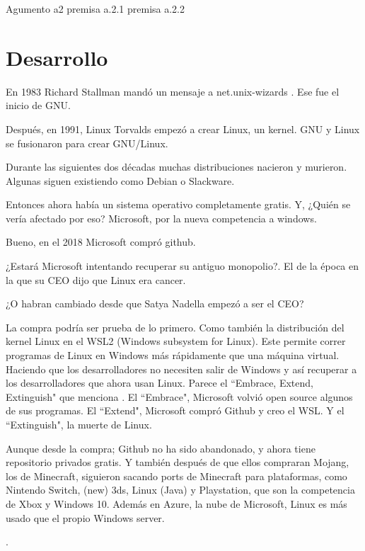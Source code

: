 \documentclass[12pt, twoside]{article}
\begin{document}
Agumento a2
premisa a.2.1
premisa a.2.2

\section{Desarrollo}%
\label{sec:Desarrollo}
En 1983 Richard Stallman mandó un mensaje a net.unix-wizards \citet[89]{faif}.
Ese fue el inicio de GNU.

Después, en 1991, Linux Torvalds empezó a crear Linux, un kernel.
GNU y Linux se fusionaron para crear GNU/Linux.

Durante las siguientes dos décadas muchas distribuciones nacieron y murieron.
Algunas siguen existiendo como Debian o Slackware. \citet{DISTROS}

Entonces ahora había un sistema operativo completamente gratis.
Y, ¿Quién se vería afectado por eso?
Microsoft, por la nueva competencia a windows. \citet{HALLO1}

Bueno, en el 2018 Microsoft compró github. \citet{GITHUB}

¿Estará Microsoft intentando recuperar su antiguo monopolio?.
El de la época en la que su CEO dijo que Linux era cancer. \citet{CANCER}

¿O habran cambiado desde que Satya Nadella empezó a ser el CEO?

La compra podría ser prueba de lo primero.
Como también la distribución del kernel Linux en el WSL2 (Windows subsystem for Linux). \citet{WSL2}
Este permite correr programas de Linux en Windows más rápidamente que una máquina virtual.
Haciendo que los desarrolladores no necesiten salir de Windows y así recuperar a los desarrolladores que ahora usan Linux. \citet{STACK}
Parece el ``Embrace, Extend, Extinguish" que menciona \citet{WSL2}.
El ``Embrace", Microsoft volvió open source algunos de sus programas.
El ``Extend", Microsoft compró Github y creo el WSL.
Y el ``Extinguish", la muerte de Linux.

Aunque desde la compra; Github no ha sido abandonado, y ahora tiene repositorio privados gratis.
Y también después de que ellos compraran Mojang, los de Minecraft, siguieron sacando ports de Minecraft para plataformas,
como Nintendo Switch, (new) 3ds, Linux (Java) y Playstation, que son la competencia de Xbox y Windows 10.
Además en Azure, la nube de Microsoft, Linux es más usado que el propio Windows server. \citet{AZURE}

\newpage
.
\vfill
\nocite{*}
\printbibliography
\end{document}
